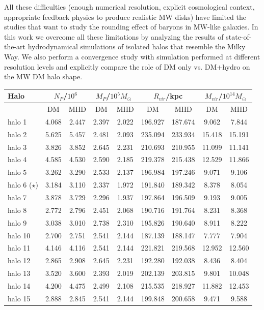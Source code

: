\documentclass[a4paper,fleqn,usenatbib]{mnras}
\begin{document}
All these difficulties (enough numerical resolution, explicit
cosmological context, appropriate feedback physics to produce
realistic MW disks) have limited the studies that want to study the
rounding effect of baryons in MW-like galaxies.
In this work we overcome all these limitations by analyzing the
results of state-of-the-art hydrodynamical simulations of isolated
halos that resemble the Milky Way.
We also perform a convergence study with simulation performed at
different resolution levels and explicitly compare the role of DM only
vs. DM+hydro on the MW DM halo shape.

\begin{table}
\centering
\begin{tabular}{l|cc|cc|cc|cc}
\hline
\hline
Halo & \multicolumn{2}{c}{$N_P$/$10^6$} & \multicolumn{2}{c}{$M_P$/$10^5M_\odot$} & 
\multicolumn{2}{c}{$R_{vir}$/kpc} & \multicolumn{2}{c}{$M_{vir}$/$10^{14} M_\odot$}  \\ \hline
& DM & MHD& DM & MHD& DM & MHD& DM & MHD\\ \hline \hline
halo 1&4.068&2.447&2.397&2.022&196.927&187.674&9.062&7.844\\
halo 2&5.625&5.457&2.481&2.093&235.094&233.934&15.418&15.191\\
halo 3&3.826&3.852&2.645&2.231&210.693&210.955&11.099&11.141\\
halo 4&4.585&4.530&2.590&2.185&219.378&215.438&12.529&11.866\\
halo 5&3.262&3.290&2.533&2.137&196.984&197.246&9.071&9.106\\ 
halo 6 ($\star$)&3.184&3.110&2.337&1.972&191.840&189.342&8.378&8.054\\ 
halo 7&3.878&3.729&2.296&1.937&197.864&196.509&9.193&9.005\\
halo 8&2.772&2.796&2.451&2.068&190.716&191.764&8.231&8.368\\
halo 9&3.038&3.010&2.738&2.310&195.826&190.640&8.911&8.222\\
halo 10&2.700&2.751&2.541&2.144&187.139&188.147&7.777&7.904\\
halo 11&4.146&4.116&2.541&2.144&221.821&219.568&12.952&12.560\\
halo 12&2.865&2.908&2.645&2.231&192.280&192.038&8.436&8.404\\
halo 13&3.520&3.600&2.393&2.019&202.139&203.815&9.801&10.048\\
halo 14&4.200&4.475&2.499&2.108&215.535&218.927&11.882&12.453\\
halo 15&2.888&2.845&2.541&2.144&199.848&200.658&9.471&9.588\\ 

\end{tabular}
\end{table}
\end{document}
